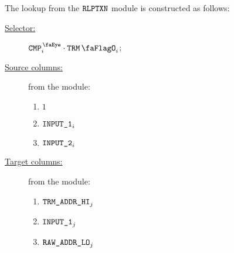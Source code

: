 The lookup from the $\texttt{RLPTXN}$ module is constructed as follows:
\begin{description}
	\item[\underline{Selector:}] $\isCmp_{i} \cdot \trmFlag_{i}$;
	\item[\underline{Source columns:}] from the \rlpTxnMod{} module:
	\begin{multicols}{3}
	\begin{enumerate}
		\item $1$
		\item $\texttt{INPUT\_1}_{i}$
		\item $\texttt{INPUT\_2}_{i}$
		
	\end{enumerate}
	\end{multicols}
\item[\underline{Target columns:}] from the \trmMod{} module: 
	\begin{multicols}{3}
	\begin{enumerate}
		\item $\texttt{TRM}\texttt{\_}\texttt{ADDR}\texttt{\_HI}_{j}$
		\item $\texttt{INPUT\_1}_{j}$
		\item $\texttt{RAW\_ADDR\_LO}_{j}$
	\end{enumerate} 
	\end{multicols}
\end{description}